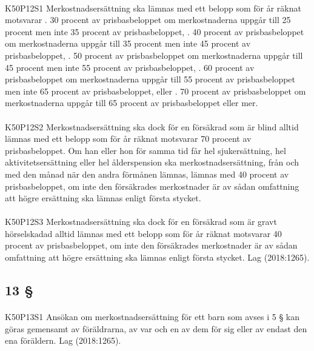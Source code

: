 \documentclass[a4paper,notitlepage,openany,10pt]{book}
\begin{document}
\paragraph*{}
{\tiny K50P12S1}
Merkostnadsersättning ska lämnas med ett belopp som för år räknat motsvarar
. 30 procent av prisbasbeloppet om merkostnaderna uppgår till 25 procent men inte 35 procent av prisbasbeloppet,
. 40 procent av prisbasbeloppet om merkostnaderna uppgår till 35 procent men inte 45 procent av prisbasbeloppet,
. 50 procent av prisbasbeloppet om merkostnaderna uppgår till 45 procent men inte 55 procent av prisbasbeloppet,
. 60 procent av prisbasbeloppet om merkostnaderna uppgår till 55 procent av prisbasbeloppet men inte 65 procent av prisbasbeloppet, eller
. 70 procent av prisbasbeloppet om merkostnaderna uppgår till 65 procent av prisbasbeloppet eller mer.
\paragraph*{}
{\tiny K50P12S2}
Merkostnadsersättning ska dock för en försäkrad som är blind alltid lämnas med ett belopp som för år räknat motsvarar 70 procent av prisbasbeloppet. Om han eller hon för samma tid får hel sjukersättning, hel aktivitetsersättning eller hel ålderspension ska merkostnadsersättning, från och med den månad när den andra förmånen lämnas, lämnas med 40 procent av prisbasbeloppet, om inte den försäkrades merkostnader är av sådan omfattning att högre ersättning ska lämnas enligt första stycket.
\paragraph*{}
{\tiny K50P12S3}
Merkostnadsersättning ska dock för en försäkrad som är gravt hörselskadad alltid lämnas med ett belopp som för år räknat motsvarar 40 procent av prisbasbeloppet, om inte den försäkrades merkostnader är av sådan omfattning att högre ersättning ska lämnas enligt första stycket.
Lag (2018:1265).
\subsection*{13 §}
\paragraph*{}
{\tiny K50P13S1}
Ansökan om merkostnadsersättning för ett barn som avses i 5 § kan göras gemensamt av föräldrarna, av var och en av dem för sig eller av endast den ena föräldern.
Lag (2018:1265).
\end{document}
